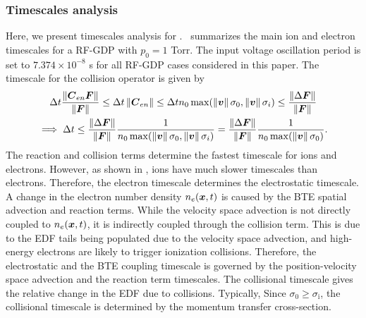
\subsubsection{Timescales analysis}
\label{subsubsec:ts_analysis}
Here, we present timescales analysis for . ~summarizes the main ion and electron timescales for a RF-GDP with $p_0=1$ Torr. The input voltage oscillation period is set to $7.374 \times 10^{-8}$ s for all RF-GDP cases considered in this paper. The timescale for the collision operator is given by
\begin{multline}
	\Delta t \frac{\norm{\vect{C}_{en} \vect{F}}}{\norm{\vect{F}}} \leq \Delta t \norm{\vect{C}_{en}} \leq \Delta t n_0\max\of{\norm{\vect{v}}\sigma_{0}, \norm{\vect{v}}\sigma_{i}}\leq \frac{\norm{\Delta \vect{F}}}{\norm{\vect{F}}}\\ \implies
	\Delta t \leq \frac{\norm{\Delta \vect{F}}}{\norm{\vect{F}}} \frac{1}{n_0\max\of{\norm{\vect{v}}\sigma_{0}, \norm{\vect{v}}\sigma_{i}}}= \frac{\norm{\Delta \vect{F}}}{\norm{\vect{F}}} \frac{1}{n_0\max\of{\norm{\vect{v}}\sigma_{0}}} \label{eq:coll_timescale}.
\end{multline} The reaction and collision terms determine the fastest timescale for ions and electrons. However, as shown in , ions have much slower timescales than electrons. Therefore, the electron timescale determines the electrostatic timescale. A change in the electron number density $n_e(\boldsymbol{x}, t)$ is caused by the BTE spatial advection and reaction terms. While the velocity space advection is not directly coupled to $n_e(\boldsymbol{x}, t)$, it is indirectly coupled through the collision term. This is due to the EDF tails being populated due to the velocity space advection, and high-energy electrons are likely to trigger ionization collisions. Therefore, the electrostatic and the BTE coupling timescale is governed by the position-velocity space advection and the reaction term timescales. The collisional timescale gives the relative change in the EDF due to collisions. Typically, Since $\sigma_0 \geq \sigma_{\text{i}}$, the collisional timescale is determined by the momentum transfer cross-section. 

